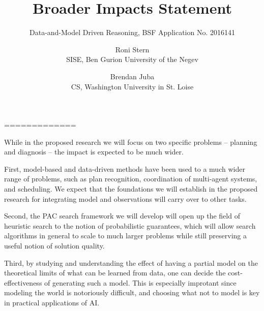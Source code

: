 













=============


\title{Broader Impacts Statement}
\subtitle{Data-and-Model Driven Reasoning, BSF Application No. 2016141}
\date{\vspace{-0.5cm}}
\author{Roni Stern \\ SISE, Ben Gurion University of the Negev
        \and Brendan Juba \\ CS, Washington University in St. Loise}



\maketitle


While in the proposed research we will focus on two specific problems -- planning and diagnosis -- the impact is expected to be much wider. 

First, model-based and data-driven methods have been used to a much wider range of problems, such as plan recognition, coordination of multi-agent systems, and scheduling. We expect that the foundations we will establish in the proposed research for integrating model and observations will carry over to other tasks. 


Second, the PAC search framework we will develop will open up the field of heuristic search to the notion of probabilistic guarantees, which will allow search algorithms in general to scale to much larger problems while still preserving a useful notion of solution quality. 

Third, by studying and understanding the effect of having a partial model on the theoretical limits of what can be learned from data, one can decide the cost-effectiveness of generating such a model. 
This is especially improtant since modeling the world is notoriously difficult, and choosing what not to model is key in practical applications of AI. 

